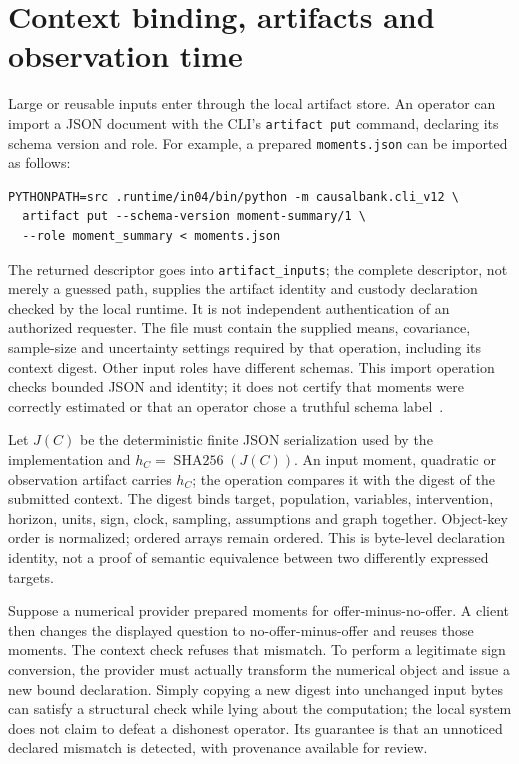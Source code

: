 \section{Context binding, artifacts and observation time}

Large or reusable inputs enter through the local artifact store. An operator
can import a JSON document with the CLI's \texttt{artifact put} command,
declaring its schema version and role. For example, a prepared
\texttt{moments.json} can be imported as follows:
\begin{lstlisting}
PYTHONPATH=src .runtime/in04/bin/python -m causalbank.cli_v12 \
  artifact put --schema-version moment-summary/1 \
  --role moment_summary < moments.json
\end{lstlisting}
The returned descriptor goes into \texttt{artifact\_inputs}; the complete
descriptor, not merely a guessed path, supplies the artifact identity and custody declaration checked by the local runtime. It is not independent authentication of an authorized requester. The file must contain the supplied means,
covariance, sample-size and uncertainty settings required by that operation,
including its context digest. Other input roles have different schemas.
This import operation checks bounded JSON and identity; it does not certify
that moments were correctly estimated or that an operator chose a truthful
schema label~\citep{exec13_i2_examples}.

Let $J(C)$ be the deterministic finite JSON serialization used by the
implementation and $h_C=\operatorname{SHA256}(J(C))$. An input moment,
quadratic or observation artifact carries $h_C$; the operation compares it
with the digest of the submitted context. The digest binds target,
population, variables, intervention, horizon, units, sign, clock, sampling,
assumptions and graph together. Object-key order is normalized; ordered
arrays remain ordered. This is byte-level declaration identity, not a proof
of semantic equivalence between two differently expressed targets.

Suppose a numerical provider prepared moments for offer-minus-no-offer.
A client then changes the displayed question to no-offer-minus-offer and
reuses those moments. The context check refuses that mismatch. To perform
a legitimate sign conversion, the provider must actually transform the
numerical object and issue a new bound declaration. Simply copying a new
digest into unchanged input bytes can satisfy a structural check while
lying about the computation; the local system does not claim to defeat a
dishonest operator. Its guarantee is that an unnoticed declared mismatch
is detected, with provenance available for review.

